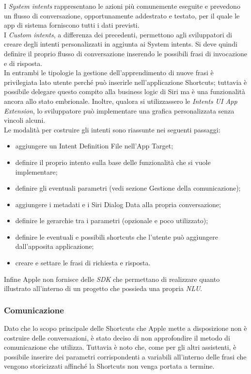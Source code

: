 		I \textit{System intents} rappresentano le azioni più comunemente eseguite e prevedono un flusso di conversazione, opportunamente addestrato e testato, per il quale le app di sistema forniscono tutti i dati previsti. \\
		I \textit{Custom intents}, a differenza dei precedenti, permettono agli sviluppatori di creare degli intenti personalizzati in aggiunta ai System intents. Si deve quindi definire il proprio flusso di conversazione inserendo le possibili frasi di invocazione e di risposta. \\
		In entrambi le tipologie la gestione dell’apprendimento di nuove frasi è privilegiata lato utente perché può inserirle nell'applicazione Shortcuts; tuttavia è possibile delegare questo compito alla business logic di Siri ma è una funzionalità ancora allo stato embrionale. Inoltre, qualora si utilizzassero le \textit{Intents UI App Extension}, lo sviluppatore può implementare una grafica personalizzata senza vincoli alcuni. \\
		Le modalità per costruire gli intenti sono riassunte nei seguenti passaggi:
		\begin{itemize}
			\item aggiungere un Intent Definition File nell’App Target;
			\item definire il proprio intento sulla base delle funzionalità che si vuole implementare;
			\item definire gli eventuali parametri (vedi sezione Gestione della comunicazione);
			\item aggiungere i metadati e i Siri Dialog Data alla propria conversazione;
			\item definire le gerarchie tra i parametri (opzionale e poco utilizzato);
			\item definire le eventuali e possibili shortcuts che l’utente può aggiungere dall'apposita applicazione;
			\item creare e settare le frasi di richiesta e risposta.
		\end{itemize}
		Infine Apple non fornisce delle \textit{SDK} che permettano di realizzare quanto illustrato all'interno di un progetto che possieda una propria \textit{NLU}.
		\subsubsection{Comunicazione}
		Dato che lo scopo principale delle Shortcuts che Apple mette a disposizione non è costruire delle conversazioni, è stato deciso di non approfondire il metodo di comunicazione che utilizza. Tuttavia è noto che, come per gli altri assistenti, è possibile inserire dei parametri corrispondenti a variabili all'interno delle frasi che vengono storicizzati affinché la Shortcuts non venga portata a termine.
